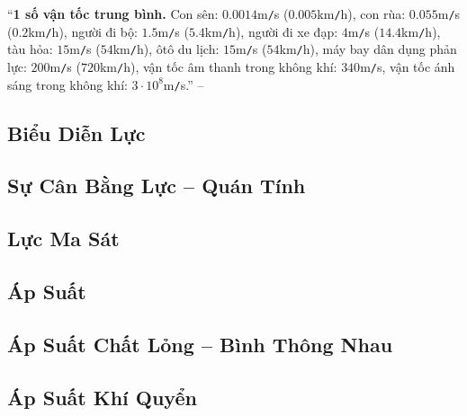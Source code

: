 \documentclass{article}
\numberwithin{equation}{section}
\begin{document}
``\textbf{1 số vận tốc trung bình.} Con sên: $0.0014$m\texttt{/}s ($0.005$km\texttt{/}h), con rùa: $0.055$m\texttt{/}s ($0.2$km\texttt{/}h), người đi bộ: $1.5$m\texttt{/}s ($5.4$km\texttt{/}h), người đi xe đạp: $4$m\texttt{/}s ($14.4$km\texttt{/}h), tàu hỏa: $15$m\texttt{/}s ($54$km\texttt{/}h), ôtô du lịch: $15$m\texttt{/}s ($54$km\texttt{/}h), máy bay dân dụng phản lực: $200$m\texttt{/}s ($720$km\texttt{/}h), vận tốc âm thanh trong không khí: $340$m\texttt{/}s, vận tốc ánh sáng trong không khí: $3\cdot 10^8$m\texttt{/}s.'' -- \cite[p. 14]{SGK_Vat_Ly_8}


\subsection{Biểu Diễn Lực}


\subsection{Sự Cân Bằng Lực -- Quán Tính}


\subsection{Lực Ma Sát}


\subsection{Áp Suất}


\subsection{Áp Suất Chất Lỏng -- Bình Thông Nhau}


\subsection{Áp Suất Khí Quyển}
\end{document}

